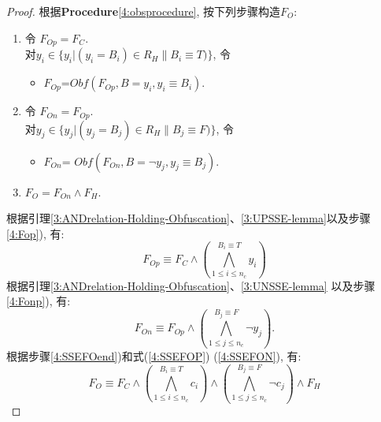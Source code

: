 \begin{proof}

根据\textbf{Procedure}\ref{4:obsprocedure}, 按下列步骤构造$F_O$:
\begin{enumerate}
\item \label{4:Fop}
令 $F_{Op}=F_C$.  \\
对$y_i \in \{y_i|(y_i=B_{i})\in R_H \parallel B_i\equiv T)\}$, 令
\begin{itemize}
 \item[] $F_{Op}$=$Obf(F_{Op},B=y_i,{y_i\equiv B_i})$.
\end{itemize}
\item  \label{4:Fonp}
令 $F_{On}=F_{Op}$. \\
对$y_j \in \{y_j|(y_j=B_j)\in R_H \parallel B_j\equiv F)\}$, 令
\begin{itemize}
 \item[] $F_{On}$= $Obf(F_{On},B=\neg y_j,{y_j\equiv B_j})$.
\end{itemize}
\item  \label{4:SSEFOend}
$F_{O}=F_{On}\wedge F_H$.
\end{enumerate}
根据引理\ref{3:ANDrelation-Holding-Obfuscation}、\ref{3:UPSSE-lemma}以及步骤\ref{4:Fop}), 有:
\begin{equation}\label{4:SSEFOP}
F_{Op} \equiv F_C\wedge (\bigwedge_{1\leqslant i\leqslant n_c}^{B_i \equiv T}y_i)
\end{equation}
根据引理\ref{3:ANDrelation-Holding-Obfuscation}、\ref{3:UNSSE-lemma} 以及步骤\ref{4:Fonp}), 有:
\begin{equation}\label{4:SSEFON}
F_{On} \equiv F_{Op}\wedge (\bigwedge_{1\leqslant j\leqslant n_c}^{B_j \equiv F}\neg y_j).
\end{equation}
根据步骤\ref{4:SSEFOend})和式(\ref{4:SSEFOP}) (\ref{4:SSEFON}), 有:
\begin{equation}\label{4:SSEFO}
F_{O} \equiv F_C \wedge
(\bigwedge_{1\leqslant i\leqslant n_c}^{B_i \equiv T}c_i)\wedge
(\bigwedge_{1\leqslant j\leqslant n_c}^{B_j \equiv F}\neg c_j) \wedge F_H
\end{equation}


\end{proof}
